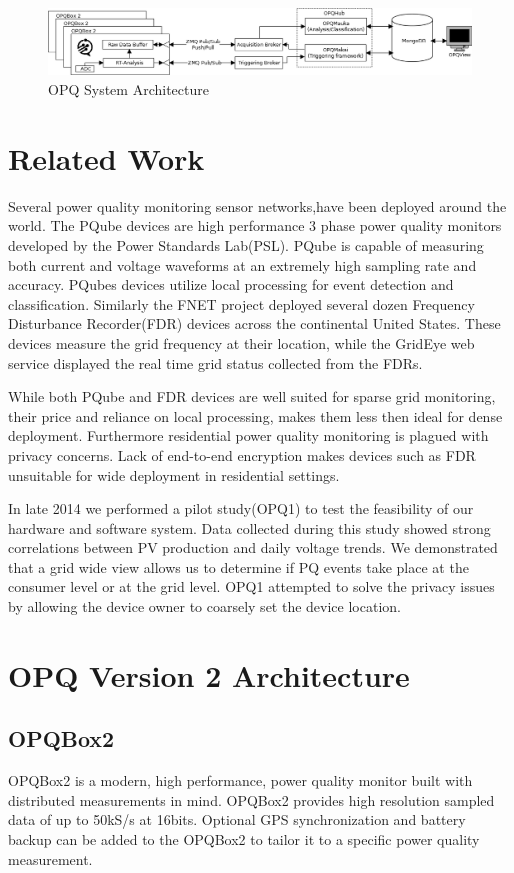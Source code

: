 \documentclass[a4paper, conference]{IEEEtran}
\begin{document}
\begin{figure}[htb!]\label{fig:system-architecture}
    \centering
    \includegraphics[width=0.9\linewidth]{img/system-diagram}
    \caption{OPQ System Architecture}
\end{figure}

\section{Related Work}

Several power quality monitoring sensor networks,have been deployed around the world. The PQube devices are high performance 3 phase power quality monitors developed by the Power Standards Lab(PSL). PQube is capable of measuring both current and voltage waveforms at an extremely high sampling rate and accuracy. PQubes devices utilize local processing for event detection and classification. Similarly the FNET project deployed several dozen Frequency Disturbance Recorder(FDR) devices across the continental United States. These devices measure the grid frequency at their location, while the GridEye web service displayed the real time grid status collected from the FDRs.

While both PQube and FDR devices are well suited for sparse grid monitoring, their price and reliance on local processing, makes them less then ideal for dense deployment. Furthermore residential power quality monitoring is plagued with privacy concerns. Lack of end-to-end encryption makes devices such as FDR unsuitable for wide deployment in residential settings.

In late 2014 we performed a pilot study(OPQ1) to test the feasibility of our hardware and software system. Data collected during this study showed strong correlations between PV production and daily voltage trends. We demonstrated that a grid wide view allows us to determine if PQ events take place at the consumer level or at the grid level. OPQ1 attempted to solve the privacy issues by allowing the device owner to coarsely set the device location.

\section{OPQ Version 2 Architecture}
\subsection{OPQBox2}
OPQBox2 is a modern, high performance, power quality monitor built with distributed measurements in mind. OPQBox2 provides high resolution sampled data of up to 50kS/s at 16bits. Optional GPS synchronization and battery backup can be added to the OPQBox2 to tailor it to a specific power quality measurement. 
\end{document}
